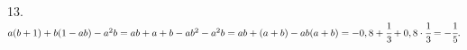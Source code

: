 13. $a(b+1)+b(1-ab)-a^2b=ab+a+b-ab^2-a^2b=ab+(a+b)-ab(a+b)=-0,8+\cfrac{1}{3}+0,8\cdot\cfrac{1}{3}=-\cfrac{1}{5}.$\\
